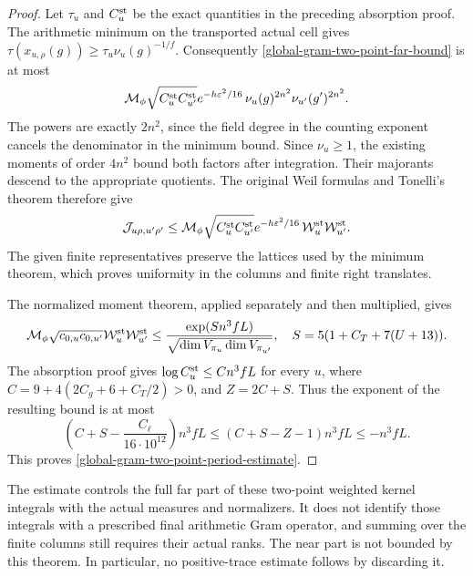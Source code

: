 \begin{proof}
Let $\tau_u$ and $C^{\rm st}_u$ be the exact quantities in the
preceding absorption proof.  The arithmetic minimum on the
transported actual cell gives
$\tau(x_{u,\rho}(g))\geq\tau_u\nu_u(g)^{-1/f}$.
Consequently \eqref{global-gram-two-point-far-bound} is at most
\[
 \mathcal M_\phi\sqrt{C^{\rm st}_uC^{\rm st}_{u'}}
 e^{-h\varepsilon^2/16}\,
          \nu_u(g)^{2n^2}\nu_{u'}(g')^{2n^2}.
\]
The powers are exactly $2n^2$, since the field degree in the
counting exponent cancels the denominator in the minimum bound.
Since $\nu_u\geq1$, the existing moments of order $4n^2$ bound
both factors after integration.  Their majorants descend to the
appropriate quotients.  The original Weil formulas and Tonelli's
theorem therefore give
\[
 \mathcal J_{u\rho,u'\rho'}\leq
 \mathcal M_\phi\sqrt{C^{\rm st}_uC^{\rm st}_{u'}}
 e^{-h\varepsilon^2/16}\,
             \mathcal W^{\rm st}_u\mathcal W^{\rm st}_{u'}.
\]
The given finite representatives preserve the lattices used by the
minimum theorem, which proves uniformity in the columns and finite
right translates.

The normalized moment theorem, applied separately and then multiplied,
gives
\[
 \mathcal M_\phi\sqrt{c_{0,u}c_{0,u'}}
 \mathcal W^{\rm st}_u\mathcal W^{\rm st}_{u'}
 \leq\frac{\exp(Sn^3fL)}{
                  \sqrt{\dim V_{\pi_u}\dim V_{\pi_{u'}}}},
 \quad S=5(1+C_T+7(U+13)).
\]
The absorption proof gives
$\log C^{\rm st}_u\leq Cn^3fL$ for every $u$, where
$C=9+4(2C_g+6+C_T/2)>0$, and $Z=2C+S$.
Thus the exponent of the resulting bound is at most
\[
 \left(C+S-\frac{C_\ell}{16\cdot10^{12}}\right)n^3fL
 \leq(C+S-Z-1)n^3fL\leq-n^3fL.
\]
This proves \eqref{global-gram-two-point-period-estimate}.
\end{proof}

The estimate controls the full far part of these two-point weighted
kernel integrals with the actual measures and normalizers.  It does
not identify those integrals with a prescribed final arithmetic Gram
operator, and summing over the finite columns still requires their
actual ranks.  The near part is not bounded by this theorem.  In
particular, no positive-trace estimate follows by discarding it.
